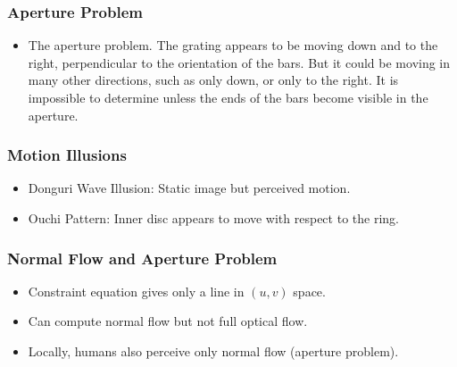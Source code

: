 \begin{frame}
  \frametitle{Aperture Problem}
  \begin{figure}[!h]
    \hspace*{2em}
  \end{figure}
  \begin{itemize}
    \item The aperture problem. The grating appears to be moving down and to the right, perpendicular to the orientation of the bars. But it could be moving in many other directions, such as only down, or only to the right. It is impossible to determine unless the ends of the bars become visible in the aperture.
  \end{itemize}
\end{frame}

\begin{frame}
  \frametitle{Motion Illusions}


  \begin{itemize}
    \item Donguri Wave Illusion: Static image but perceived motion.
    \item Ouchi Pattern: Inner disc appears to move with respect to the ring.
  \end{itemize}

  \vspace{0.5cm}
  \centering
\end{frame}

\begin{frame}
  \frametitle{Normal Flow and Aperture Problem}
  \begin{itemize}
    \item Constraint equation gives only a line in $(u,v)$ space.
    \item Can compute normal flow but not full optical flow.
    \item Locally, humans also perceive only normal flow (aperture problem).
  \end{itemize}

  \vspace{0.5cm}
  \centering
\end{frame}

